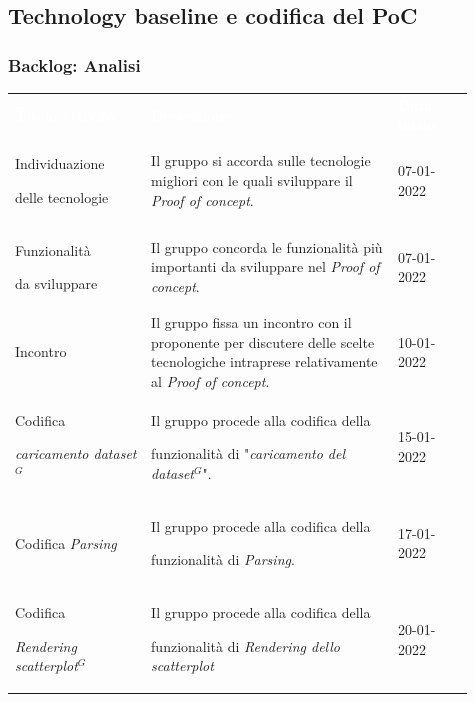 \subsection{Technology baseline e codifica del PoC}
\subsubsection{Backlog: Analisi}
{\renewcommand{\arraystretch}{1.5}
\begin{longtable}{p{0.27\linewidth}p{0.49\linewidth}p{0.15\linewidth}}
	\rowcolor[RGB]{33, 73, 50}
	\textcolor{white}{\textbf{Titolo attività}} & \textcolor{white}{\textbf{Descrizione}} & \textcolor{white}{\textbf{Data inizio}}\\
    
    \rowcolor[RGB]{216, 235, 171}
    Individuazione \par delle tecnologie & Il gruppo si accorda sulle tecnologie migliori con le quali sviluppare il \textit{Proof of concept}. & 07-01-2022\\

    \rowcolor[RGB]{233, 245, 206}
    Funzionalità \par da sviluppare & Il gruppo concorda le funzionalità più importanti da sviluppare nel \textit{Proof of concept}. & 07-01-2022\\

    \rowcolor[RGB]{216, 235, 171}
    Incontro & Il gruppo fissa un incontro con il proponente per discutere delle scelte tecnologiche intraprese relativamente al \textit{Proof of concept}. & 10-01-2022\\

    \rowcolor[RGB]{233, 245, 206}
    Codifica \par \textit{caricamento dataset$^{G}$} & Il gruppo procede alla codifica della \par funzionalità di "\textit{caricamento del dataset$^{G}$}". & 15-01-2022\\

    \rowcolor[RGB]{216, 235, 171}
    Codifica \textit{Parsing} & Il gruppo procede alla codifica della \par funzionalità di \textit{Parsing}. & 17-01-2022\\

    \rowcolor[RGB]{233, 245, 206}
    Codifica \par \textit{Rendering scatterplot$^{G}$} & Il gruppo procede alla codifica della \par funzionalità di \textit{Rendering dello scatterplot} & 20-01-2022\\


\end{longtable}}
